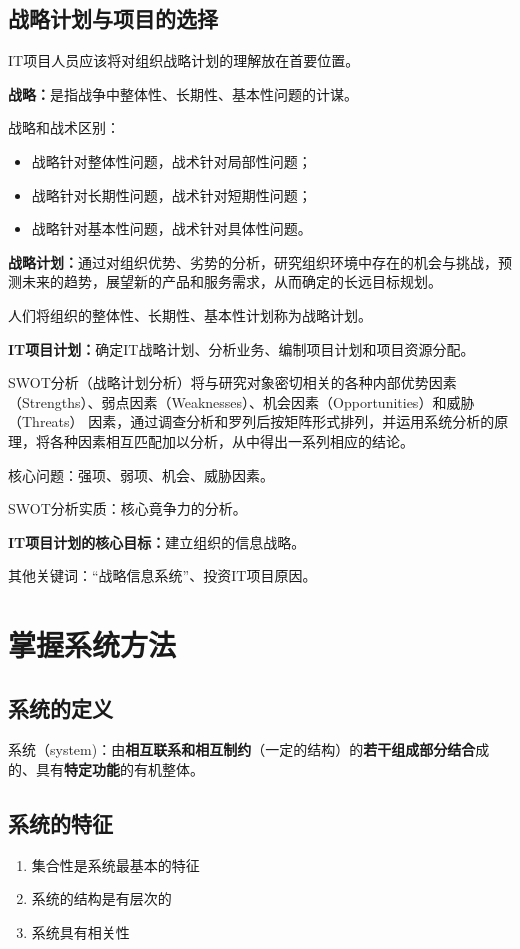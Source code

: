 \subsection{战略计划与项目的选择}
IT项目人员应该将对组织战略计划的理解放在首要位置。
\par \textbf{战略：}是指战争中整体性、长期性、基本性问题的计谋。
\par 战略和战术区别：
\begin{itemize}
	\item 战略针对整体性问题，战术针对局部性问题；
	\item 战略针对长期性问题，战术针对短期性问题；
	\item 战略针对基本性问题，战术针对具体性问题。
\end{itemize}
\par \textbf{战略计划：}通过对组织优势、劣势的分析，研究组织环境中存在的机会与挑战，预测未来的趋势，展望新的产品和服务需求，从而确定的长远目标规划。
\par 人们将组织的整体性、长期性、基本性计划称为战略计划。
\par \textbf{IT项目计划：}确定IT战略计划、分析业务、编制项目计划和项目资源分配。
\par SWOT分析（战略计划分析）将与研究对象密切相关的各种内部优势因素（Strengths）、弱点因素（Weaknesses）、机会因素（Opportunities）和威胁（Threats） 因素，通过调查分析和罗列后按矩阵形式排列，并运用系统分析的原理，将各种因素相互匹配加以分析，从中得出一系列相应的结论。
\par 核心问题：强项、弱项、机会、威胁因素。
\par SWOT分析实质：核心竟争力的分析。
\par \textbf{IT项目计划的核心目标：}建立组织的信息战略。
\par 其他关键词：“战略信息系统”、投资IT项目原因。
\section{掌握系统方法}
\subsection{系统的定义}
系统（system)：由\textbf{相互联系和相互制约}（一定的结构）的\textbf{若干组成部分结合}成的、具有\textbf{特定功能}的有机整体。
\subsection{系统的特征}
\begin{enumerate}
	\item 集合性是系统最基本的特征
	\item 系统的结构是有层次的
	\item 系统具有相关性
\end{enumerate}
